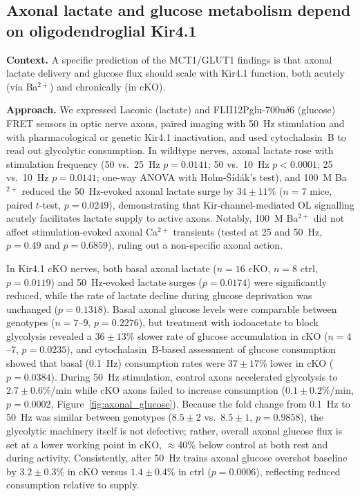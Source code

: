 \documentclass[11pt,a4paper]{article}
\begin{document}
\subsection{Axonal lactate and glucose metabolism depend on oligodendroglial Kir4.1}

\textbf{Context.} A specific prediction of the MCT1/GLUT1 findings is that axonal lactate delivery and glucose flux should scale with Kir4.1 function, both acutely (via Ba$^{2+}$) and chronically (in cKO).

\textbf{Approach.} We expressed Laconic (lactate) and FLII12Pglu-700u$\delta$6 (glucose) FRET sensors in optic nerve axons, paired imaging with 50~Hz stimulation and with pharmacological or genetic Kir4.1 inactivation, and used cytochalasin~B to read out glycolytic consumption. In wildtype nerves, axonal lactate rose with stimulation frequency (50 vs.\ 25~Hz $p=0.0141$; 50 vs.\ 10~Hz $p<0.0001$; 25 vs.\ 10~Hz $p=0.0141$; one-way ANOVA with Holm-\v{S}{\'i}d{\'a}k's test), and 100~\textmu M Ba$^{2+}$ reduced the 50~Hz-evoked axonal lactate surge by $34 \pm 11\%$ ($n=7$ mice, paired $t$-test, $p=0.0249$), demonstrating that Kir-channel-mediated OL signalling acutely facilitates lactate supply to active axons. Notably, 100~\textmu M Ba$^{2+}$ did not affect stimulation-evoked axonal Ca$^{2+}$ transients (tested at 25 and 50~Hz, $p=0.49$ and $p=0.6859$), ruling out a non-specific axonal action.

In Kir4.1 cKO nerves, both basal axonal lactate ($n=16$ cKO, $n=8$ ctrl, $p=0.0119$) and 50~Hz-evoked lactate surges ($p=0.0174$) were significantly reduced, while the rate of lactate decline during glucose deprivation was unchanged ($p=0.1318$). Basal axonal glucose levels were comparable between genotypes ($n=7$--9, $p=0.2276$), but treatment with iodoacetate to block glycolysis revealed a $36 \pm 13\%$ slower rate of glucose accumulation in cKO ($n=4$--7, $p=0.0235$), and cytochalasin~B-based assessment of glucose consumption showed that basal (0.1~Hz) consumption rates were $37 \pm 17\%$ lower in cKO ($p=0.0384$). During 50~Hz stimulation, control axons accelerated glycolysis to $2.7 \pm 0.6\%$/min while cKO axons failed to increase consumption ($0.1 \pm 0.2\%$/min, $p=0.0002$, Figure~\ref{fig:axonal_glucose}). Because the fold change from 0.1~Hz to 50~Hz was similar between genotypes ($8.5 \pm 2$ vs.\ $8.5 \pm 1$, $p=0.9858$), the glycolytic machinery itself is not defective; rather, overall axonal glucose flux is set at a lower working point in cKO, $\approx$40\% below control at both rest and during activity. Consistently, after 50~Hz trains axonal glucose overshot baseline by $3.2 \pm 0.3\%$ in cKO versus $1.4 \pm 0.4\%$ in ctrl ($p=0.0006$), reflecting reduced consumption relative to supply.
\end{document}

